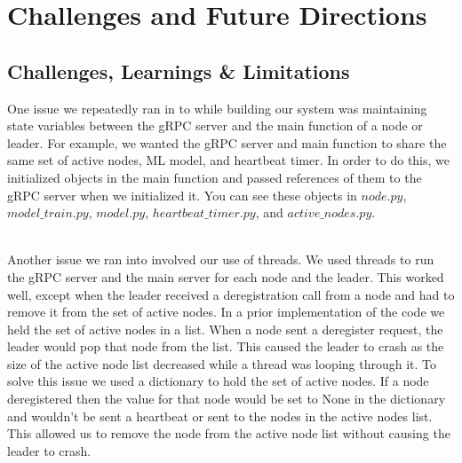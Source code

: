 \documentclass{article}
\begin{document}
\section{Challenges and Future Directions}

\subsection{Challenges, Learnings \& Limitations}
\label{sec:cll}
One issue we repeatedly ran in to while building our system was maintaining state variables between the gRPC server and the main function of a node or leader. For example, we wanted the gRPC server and main function to share the same set of active nodes, ML model, and heartbeat timer. In order to do this, we initialized objects in the main function and passed references of them to the gRPC server when we initialized it. You can see these objects in $node.py$, $model\_train.py$, $model.py$, $heartbeat\_timer.py$, and $active\_nodes.py$.

\\

Another issue we ran into involved our use of threads. We used threads to run the gRPC server and the main server for each node and the leader. This worked well, except when the leader received a deregistration call from a node and had to remove it from the set of active nodes. In a prior implementation of the code we held the set of active nodes in a list. When a node sent a deregister request, the leader would pop that node from the list. This caused the leader to crash as the size of the active node list decreased while a thread was looping through it. To solve this issue we used a dictionary to hold the set of active nodes. If a node deregistered then the value for that node would be set to None in the dictionary and wouldn't be sent a heartbeat or sent to the nodes in the active nodes list. This allowed us to remove the node from the active node list without causing the leader to crash.

\\
\end{document}
